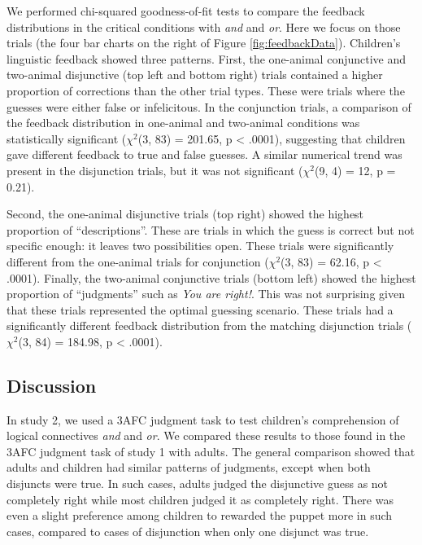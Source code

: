 \documentclass[floatsintext,man]{apa6}
\theoremstyle{definition}
\theoremstyle{definition}
\theoremstyle{definition}
\theoremstyle{remark}
\begin{document}
We performed chi-squared goodness-of-fit tests to compare the feedback
distributions in the critical conditions with \emph{and} and \emph{or}.
Here we focus on those trials (the four bar charts on the right of
Figure \ref{fig:feedbackData}). Children's linguistic feedback showed
three patterns. First, the one-animal conjunctive and two-animal
disjunctive (top left and bottom right) trials contained a higher
proportion of corrections than the other trial types. These were trials
where the guesses were either false or infelicitous. In the conjunction
trials, a comparison of the feedback distribution in one-animal and
two-animal conditions was statistically significant (\(\chi^2\)(3, 83) =
201.65, p \textless{} .0001), suggesting that children gave different
feedback to true and false guesses. A similar numerical trend was
present in the disjunction trials, but it was not significant
(\(\chi^2\)(9, 4) = 12, p = 0.21).

Second, the one-animal disjunctive trials (top right) showed the highest
proportion of \enquote{descriptions}. These are trials in which the
guess is correct but not specific enough: it leaves two possibilities
open. These trials were significantly different from the one-animal
trials for conjunction (\(\chi^2\)(3, 83) = 62.16, p \textless{} .0001).
Finally, the two-animal conjunctive trials (bottom left) showed the
highest proportion of \enquote{judgments} such as \emph{You are right!}.
This was not surprising given that these trials represented the optimal
guessing scenario. These trials had a significantly different feedback
distribution from the matching disjunction trials (\(\chi^2\)(3, 84) =
184.98, p \textless{} .0001).

\subsection{Discussion}\label{discussion-1}

In study 2, we used a 3AFC judgment task to test children's
comprehension of logical connectives \emph{and} and \emph{or}. We
compared these results to those found in the 3AFC judgment task of study
1 with adults. The general comparison showed that adults and children
had similar patterns of judgments, except when both disjuncts were true.
In such cases, adults judged the disjunctive guess as not completely
right while most children judged it as completely right. There was even
a slight preference among children to rewarded the puppet more in such
cases, compared to cases of disjunction when only one disjunct was true.
\end{document}
